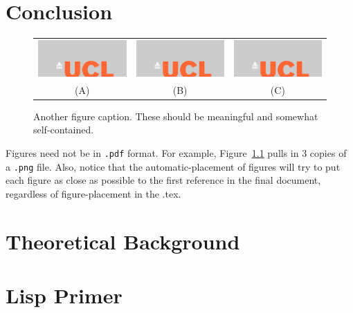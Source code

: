 \documentclass[12pt]{ucl_thesis}
\begin{document}
\chapter{Conclusion}
\label{chp:conc}
%

\begin{figure}
\begin{center}
\begin{tabular}{c|cc}   %
   \includegraphics[width=.30\columnwidth]{home.png} &  %
   \includegraphics[width=.30\columnwidth]{home.png} &  
   \includegraphics[width=.30\columnwidth]{home.png}\\
   (A) & (B) & (C)
\end{tabular}
\caption{Another figure caption. These should be meaningful and somewhat self-contained.} 
  \label{fig:SomeMoreFigs}
\end{center}
\end{figure}

Figures need not be in \texttt{.pdf} format. For example, Figure~\ref{fig:SomeMoreFigs} pulls in $3$ copies of a \texttt{.png} file. Also, notice that the automatic-placement of figures will try to put each figure as close as possible to the first reference in the final document, regardless of figure-placement in the .tex.




\cleardoublepage
\appendix
\chapter{Theoretical Background}
\label{chp:theory}
%

\chapter{Lisp Primer}
\label{cha:lisp-primer}
%




\end{document}

